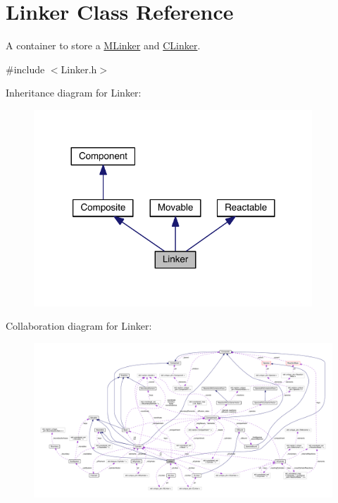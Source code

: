 \hypertarget{classLinker}{\section{Linker Class Reference}
\label{classLinker}
}


A container to store a \hyperlink{classMLinker}{M\+Linker} and \hyperlink{classCLinker}{C\+Linker}.  




{\ttfamily \#include $<$Linker.\+h$>$}



Inheritance diagram for Linker\+:\nopagebreak
\begin{figure}[H]
\begin{center}
\leavevmode
\includegraphics[width=296pt]{classLinker__inherit__graph}
\end{center}
\end{figure}


Collaboration diagram for Linker\+:\nopagebreak
\begin{figure}[H]
\begin{center}
\leavevmode
\includegraphics[width=350pt]{classLinker__coll__graph}
\end{center}
\end{figure}
